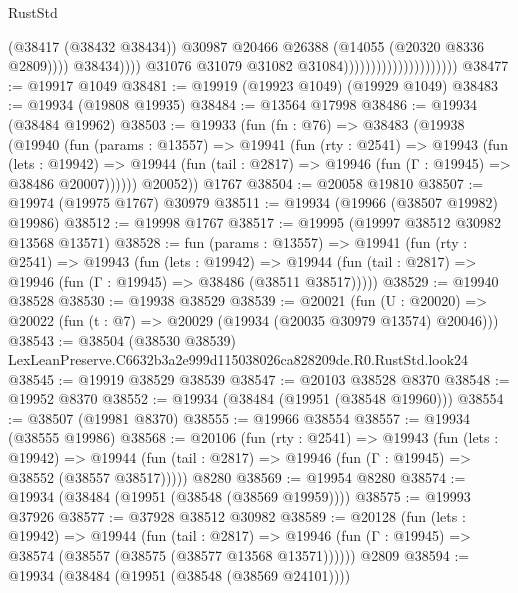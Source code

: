 \begin{lexlean}{RustStd}
\begin{coremodule}
                                                          (@38417 (@38432 @38434))
                                                          @30987
                                                          @20466
                                                          @26388
                                                          (@14055 (@20320 @8336 @2809))))
                                                      @38434))))
                                              @31076
                                              @31079
                                              @31082
                                              @31084)))))))))))))))))))))
@38477 := @19917 @1049
@38481 := @19919 (@19923 @1049) (@19929 @1049)
@38483 := @19934 (@19808 @19935)
@38484 := @13564 @17998
@38486 := @19934 (@38484 @19962)
@38503 := @19933
    (fun (fn : @76) =>
    @38483
      (@19938
        (@19940
          (fun (params : @13557) =>
          @19941
            (fun (rty : @2541) =>
            @19943
              (fun (lets : @19942) =>
              @19944 (fun (tail : @2817) => @19946 (fun (Γ : @19945) => @38486 @20007))))))
        @20052))
    @1767
@38504 := @20058 @19810
@38507 := @19974 (@19975 @1767) @30979
@38511 := @19934 (@19966 (@38507 @19982) @19986)
@38512 := @19998 @1767
@38517 := @19995 (@19997 @38512 @30982 @13568 @13571)
@38528 := fun (params : @13557) =>
  @19941
    (fun (rty : @2541) =>
    @19943
      (fun (lets : @19942) =>
      @19944 (fun (tail : @2817) => @19946 (fun (Γ : @19945) => @38486 (@38511 @38517)))))
@38529 := @19940 @38528
@38530 := @19938 @38529
@38539 := @20021
    (fun (U : @20020) => @20022 (fun (t : @7) => @20029 (@19934 (@20035 @30979 @13574) @20046)))
@38543 := @38504 (@38530 @38539) LexLeanPreserve.C6632b3a2e999d115038026ca828209de.R0.RustStd.look24
@38545 := @19919 @38529 @38539
@38547 := @20103 @38528 @8370
@38548 := @19952 @8370
@38552 := @19934 (@38484 (@19951 (@38548 @19960)))
@38554 := @38507 (@19981 @8370)
@38555 := @19966 @38554
@38557 := @19934 (@38555 @19986)
@38568 := @20106
    (fun (rty : @2541) =>
    @19943
      (fun (lets : @19942) =>
      @19944 (fun (tail : @2817) => @19946 (fun (Γ : @19945) => @38552 (@38557 @38517)))))
    @8280
@38569 := @19954 @8280
@38574 := @19934 (@38484 (@19951 (@38548 (@38569 @19959))))
@38575 := @19993 @37926
@38577 := @37928 @38512 @30982
@38589 := @20128
    (fun (lets : @19942) =>
    @19944
      (fun (tail : @2817) =>
      @19946 (fun (Γ : @19945) => @38574 (@38557 (@38575 (@38577 @13568 @13571))))))
    @2809
@38594 := @19934 (@38484 (@19951 (@38548 (@38569 @24101))))

\end{coremodule}
\end{lexlean}
